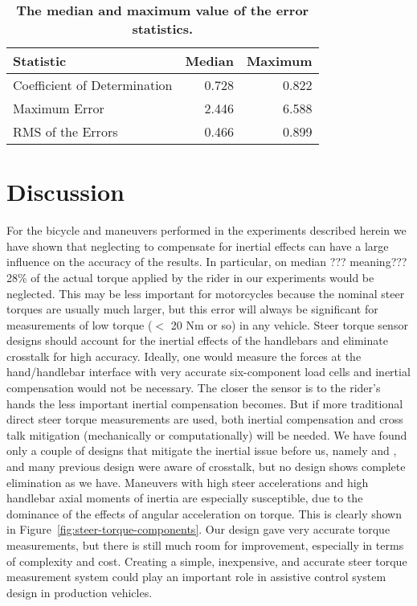 \documentclass[10pt]{article}
\begin{document}
\begin{table}
  \caption{{\bf The median and maximum value of the error statistics.}}
  \centering
  \begin{tabular}{lrr}
    \hline
    Statistic                    & Median   & Maximum \\
    \hline
    Coefficient of Determination & 0.728 & 0.822 \\
    Maximum Error                & 2.446 & 6.588 \\
    RMS of the Errors            & 0.466 & 0.899
  \end{tabular}
  \label{tab:medians}
\end{table}

\section*{Discussion}

For the bicycle and maneuvers performed in the experiments described herein we have shown
that neglecting to compensate for inertial effects can have a large influence
on the accuracy of the results. In particular, on median ??? meaning??? 28\% of the actual
torque applied by the rider in our experiments would be neglected. This may be
less important for motorcycles because the nominal steer torques are usually
much larger, but this error will always be significant for measurements of low
torque ($<$ 20 Nm or so) in any vehicle. Steer torque sensor designs should
account for the inertial effects of the handlebars and eliminate crosstalk for
high accuracy. Ideally, one would measure the forces at the hand/handlebar
interface with very accurate six-component load cells and inertial compensation
would not be necessary. The closer the sensor is to the rider's hands the less
important inertial compensation becomes. But if more traditional direct steer
torque measurements are used, both inertial compensation and cross talk
mitigation (mechanically or computationally) will be needed. We have found only
a couple of designs that mitigate the inertial issue before us, namely
\cite{Evertse2010} and \cite{Iuchi2006}, and many previous design were aware of
crosstalk, but no design shows complete elimination as we have. Maneuvers with
high steer accelerations and high handlebar axial moments of inertia are
especially susceptible, due to the dominance of the effects of angular
acceleration on torque. This is clearly shown in
Figure~\ref{fig:steer-torque-components}. Our design gave very accurate torque
measurements, but there is still much room for improvement, especially in terms
of complexity and cost. Creating a simple, inexpensive, and accurate steer
torque measurement system could play an important role in assistive control
system design in production vehicles.
\end{document}
